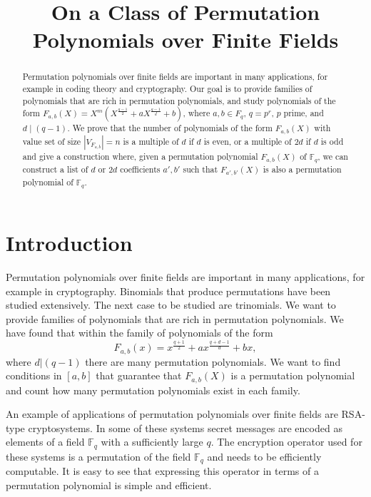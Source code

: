 \documentclass{article}
\theoremstyle{definition}
\theoremstyle{remark}
\numberwithin{equation}{section}
\begin{document}
\title{On a Class of Permutation Polynomials over Finite Fields}


\maketitle

\begin{abstract}
Permutation polynomials over finite fields are important in many applications, for example in coding theory and cryptography. Our goal is to provide families of polynomials that are rich in permutation polynomials, and study polynomials of the form $F_{a,b}(X) =X^m\left(X^{\frac{q-1}{2}} + a X^{\frac{q-1}{d}} + b \right)$, where $a,b \in F_{q}$, $q=p^r$, $p$ prime, and $d \mid (q-1)$. We prove that the number of polynomials of the form $F_{a,b}(X)$ with value set of size $\left\vert V_{F_{a,b}} \right\vert =n$ is a multiple of $d$ if $d$ is even, or a multiple of $2d$ if $d$ is odd and give a construction where, given a permutation polynomial $F_{a,b}(X)$ of $\mathbb{F}_q$, we can construct a list of $d$ or $2d$ coefficients $a',b'$ such that $F_{a',b'}(X)$ is also a permutation polynomial of $\mathbb{F}_q$.
\end{abstract}


\section{Introduction}

Permutation polynomials over finite fields are important in many applications, for example in cryptography. Binomials that produce permutations have been studied extensively. The next case to be studied are trinomials. We want to provide families of polynomials that are rich in permutation polynomials. We have found that within the family of polynomials of the form $$F_{a,b}(x) = x^{\frac{q+1}{2}} + a x^{\frac{q+d-1}{d}} + b x,$$ where $d | (q-1)$  there are many permutation polynomials. We want to find conditions in $[a,b]$ that guarantee that $F_{a,b}(X)$ is a permutation polynomial and count how many permutation polynomials exist in each family.

An example of applications of permutation polynomials over finite fields are RSA-type cryptosystems. In some of these systems secret messages are encoded as elements of a field $\mathbb{F}_{q}$ with a sufficiently large $q$. The encryption operator used for these systems is a permutation of the field $\mathbb{F}_{q}$ and needs to be efficiently computable. It is easy to see that expressing this operator in terms of a permutation polynomial is simple and efficient.
\end{document}
